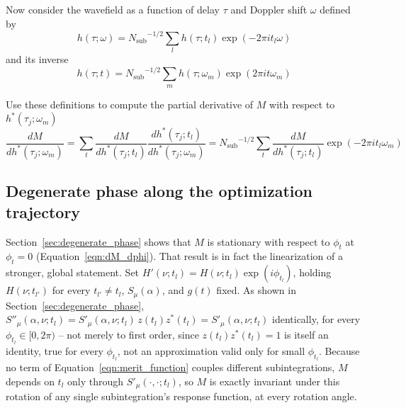 \documentclass[manuscript]{aastex631}
\newcommand{\Nsub}{\ensuremath{N_\mathrm{sub}}}
\newcommand{\Eqn}[1]{Equation~\ref{eqn:#1}}
\begin{document}
Now consider the wavefield as a function of delay $\tau$
and Doppler shift $\omega$  defined by 
\begin{equation}
    h(\tau;\omega) = \Nsub^{-1/2} \sum_l h(\tau; t_l) \exp(- 2\pi i t_l \omega)
    \label{eqn:forward_dft_tau_omega}
\end{equation}
and its inverse
\begin{equation}
    h(\tau;t) = \Nsub^{-1/2} \sum_m h(\tau; \omega_m) \exp(2\pi i t \omega_m)
    \label{eqn:inverse_dft_omega_tau}
\end{equation}

Use these definitions to compute the partial derivative of $M$ with respect to $h^*(\tau_j;\omega_m)$
\begin{equation}
\frac{dM}{dh^*(\tau_j;\omega_m)}
 = \sum_t \frac{dM}{dh^*(\tau_j;t_l)} \frac{dh^*(\tau_j;t_l)}{dh^*(\tau_j;\omega_m)}
  = \Nsub^{-1/2} \sum_t \frac{dM}{dh^*(\tau_j;t_l)} \exp(-2\pi i t_l \omega_m)
\label{eqn:dM_dh_tau_omega}
\end{equation}




\subsection{Degenerate phase along the optimization trajectory}
\label{sec:gauge_stability}

\noindent
Section~\ref{sec:degenerate_phase} shows that $M$ is stationary with respect to $\phi_t$ at
$\phi_t=0$ (\Eqn{dM_dphi}). That result is in fact the linearization of a stronger, global
statement. Set $H'(\nu;t_l) = H(\nu;t_l)\exp(i\phi_{t_l})$, holding $H(\nu;t_{l'})$ for every
$t_{l'}\ne t_l$, $S_\mu(\alpha)$, and $g(t)$ fixed. As shown in Section~\ref{sec:degenerate_phase},
$S''_\mu(\alpha,\nu;t_l) = S'_\mu(\alpha,\nu;t_l)\, z(t_l) z^*(t_l) = S'_\mu(\alpha,\nu;t_l)$
identically, for every $\phi_{t_l}\in[0,2\pi)$ -- not merely to first order, since $z(t_l)z^*(t_l)=1$
is itself an identity, true for every $\phi_{t_l}$, not an approximation valid only for small
$\phi_{t_l}$. Because no term of \Eqn{merit_function} couples different subintegrations, $M$
depends on $t_l$ only through $S'_\mu(\cdot,\cdot;t_l)$, so $M$ is exactly invariant under this
rotation of any single subintegration's response function, at every rotation angle.
\end{document}
